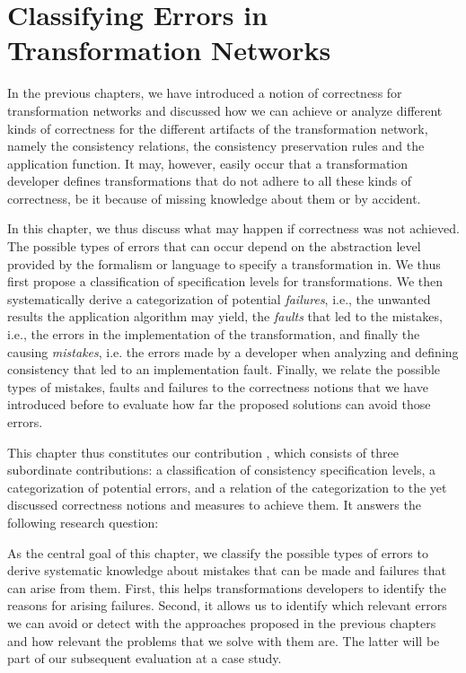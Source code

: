\chapter{Classifying Errors in Transformation Networks 
}
\label{chap:errors}

In the previous chapters, we have introduced a notion of correctness for transformation networks and discussed how we can achieve or analyze different kinds of correctness for the different artifacts of the transformation network, namely the consistency relations, the consistency preservation rules and the application function.
It may, however, easily occur that a transformation developer defines transformations that do not adhere to all these kinds of correctness, be it because of missing knowledge about them or by accident.

In this chapter, we thus discuss what may happen if correctness was not achieved.
The possible types of errors that can occur depend on the abstraction level provided by the formalism or language to specify a transformation in.
We thus first propose a classification of specification levels for transformations.
We then systematically derive a categorization of potential \emph{failures}, i.e., the unwanted results the application algorithm may yield, the \emph{faults} that led to the mistakes, i.e., the errors in the implementation of the transformation, and finally the causing \emph{mistakes}, i.e. the errors made by a developer when analyzing and defining consistency that led to an implementation fault.
Finally, we relate the possible types of mistakes, faults and failures to the correctness notions that we have introduced before to evaluate how far the proposed solutions can avoid those errors.

This chapter thus constitutes our contribution , which consists of three subordinate contributions: a classification of consistency specification levels, a categorization of potential errors, and a relation of the categorization to the yet discussed correctness notions and measures to achieve them.
It answers the following research question:


As the central goal of this chapter, we classify the possible types of errors to derive systematic knowledge about mistakes that can be made and failures that can arise from them.
First, this helps transformations developers to identify the reasons for arising failures.
Second, it allows us to identify which relevant errors we can avoid or detect with the approaches proposed in the previous chapters and how relevant the problems that we solve with them are.
The latter will be part of our subsequent evaluation at a case study.

